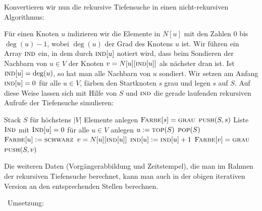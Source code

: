\begin{bem}
Konvertieren wir nun die rekursive Tiefensuche in einen nicht-rekursiven Algorithmus:

Für einen Knoten $u$ indizieren wir die Elemente in $N[u]$ mit den Zahlen $0$ bis $\deg(u)-1$, wobei $\deg(u)$ der Grad des Knotens $u$ ist. Wir führen ein Array $\mathop{\text{\textsc{ind}}}$ ein, in dem durch $\mathop{\text{\textsc{ind}}}[u]$ notiert wird, dass beim Sondieren der Nachbarn von $u \in V$ der Knoten $v=N[u][\mathop{\text{\textsc{ind}}}[u]]$ als  nächster dran ist. Ist $\mathop{\text{\textsc{ind}}}[u]= \deg(u)$, so hat man alle Nachbarn von $u$ sondiert. Wir setzen am Anfang $\mathop{\text{\textsc{ind}}}[u]=0$ für alle $u \in V$, färben den Startknoten $s$ grau und legen $s$ auf $S$. Auf diese Weise lassen sich mit Hilfe von $S$ und $\mathop{\text{\textsc{ind}}}$ die gerade laufenden rekursiven Aufrufe der Tiefensuche simulieren: 

	\begin{algorithm}[H]
		\caption{$\cc{Tiefensuche-mit-Stack}(s)$} 
		\begin{algorithmic}[1]
			\STATE Stack $S$ für höchstens $|V|$ Elemente anlegen
			\STATE $\mathop{\text{\textsc{Farbe}}}[s] = \mathop{\text{\textsc{grau}}}$ 
			\STATE $\mathop{\text{\textsc{push}}}(S,s)$
			\STATE Liste $\mathop{\text{\textsc{Ind}}}$  mit $\mathop{\text{\textsc{Ind}}}[u]=0$ für alle $u \in V$ anlegen
			\STATE $u:= \mathop{\text{\textsc{top}}}(S)$ \quad {}
			\STATE $\mathop{\text{\textsc{pop}}}(S)$   \quad {}
			\STATE $\mathop{\text{\textsc{Farbe}}}[u] := \mathop{\text{\textsc{schwarz}}}$
			\ELSE
			\STATE $v=N[u][\mathop{\text{\textsc{ind}}}[u]]$ \quad {} 
			\STATE $\mathop{\text{\textsc{ind}}}[u]:=\mathop{\text{\textsc{ind}}}[u]+1$				
			\STATE $\mathop{\text{\textsc{Farbe}}}[v] = \mathop{\text{\textsc{grau}}}$ \quad {}
			\STATE $\mathop{\text{\textsc{push}}}(S,v)$ \quad {}
			\ENDIF 
			\ENDIF 
			\ENDWHILE  
		\end{algorithmic}
	\end{algorithm}

	Die weiteren Daten (Vorgängerabbildung und Zeitstempel), die man im Rahmen der rekursiven Tiefensuche berechnet, kann man auch in der obigen iterativen Version an den entsprechenden Stellen berechnen. 
\end{bem}

\begin{bem}\ Umsetzung: 

\end{bem} 


